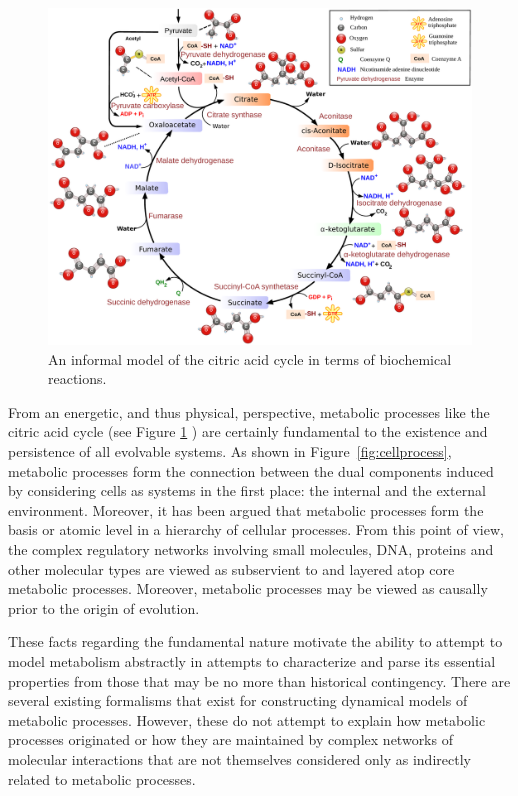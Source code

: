 \begin{figure}
\begin{center}
\noindent\includegraphics[width=0.7\columnwidth]{fig/Citric_acid_cycle.pdf}
\end{center}
\caption{An informal model of the citric acid cycle in terms of biochemical reactions.}
\label{fig:ctacyc}
\end{figure}
From an energetic, and thus physical, perspective, metabolic processes like the citric acid cycle (see Figure \ref{fig:ctacyc} ) are certainly fundamental to the existence and persistence of all evolvable systems. As shown in Figure~\ref{fig:cellprocess}, metabolic processes form the connection between the dual components induced by considering cells as systems in the first place: the internal and the external environment. Moreover, it has been argued that metabolic processes form the basis or atomic level in a hierarchy of cellular processes. From this point of view, the complex regulatory networks involving small molecules, DNA, proteins and other molecular types are viewed as subservient to and layered atop core metabolic processes. Moreover, metabolic processes may be viewed as causally prior to the origin of evolution.

These facts regarding the fundamental nature motivate the ability to attempt to model metabolism abstractly in attempts to characterize and parse its essential properties from those that may be no more than historical contingency. There are several existing formalisms that exist for constructing dynamical models of metabolic processes. However, these do not attempt to explain how metabolic processes originated or how they are maintained by complex networks of molecular interactions that are not themselves considered only as indirectly related to metabolic processes.

